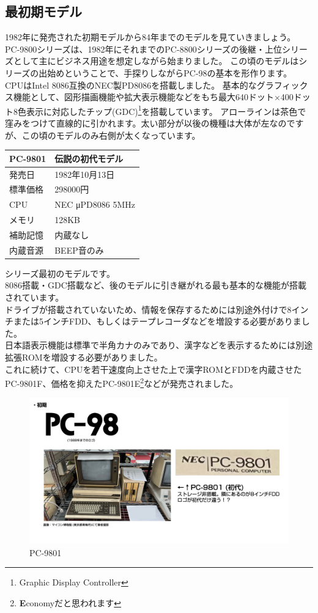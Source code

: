 \documentclass[b5paper,9pt,platex,dvipdfmx]{jsarticle}
\begin{document}
\begin{multicols}{3}
\subsection{最初期モデル}
1982年に発売された初期モデルから84年までのモデルを見ていきましょう。
PC-9800シリーズは、1982年にそれまでのPC-8800シリーズの後継・上位シリーズとして主にビジネス用途を想定しながら始まりました。
この頃のモデルはシリーズの出始めということで、手探りしながらPC-98の基本を形作ります。
CPUはIntel 8086互換のNEC製PD8086を搭載しました。
基本的なグラフィックス機能として、図形描画機能や拡大表示機能などをもち最大640ドット×400ドット8色表示に対応したチップ(GDC)\footnote{Graphic Display Controller}を搭載しています。
アローラインは茶色で窪みをつけて直線的に引かれます。太い部分が以後の機種は大体が左なのですが、この頃のモデルのみ右側が太くなっています。
\begin{table}[H]
  \centering
    \begin{tabular}{ll}
        {\bf PC-9801} & 伝説の初代モデル\\ \hline
        発売日 & 1982年10月13日\\
        標準価格 & 298000円\\
        CPU & NEC μPD8086 5MHz\\
        メモリ & 128KB\\
        補助記憶 & 内蔵なし\\
        内蔵音源 & BEEP音のみ\\
        \end{tabular}
\end{table}
シリーズ最初のモデルです。\\
8086搭載・GDC搭載など、後のモデルに引き継がれる最も基本的な機能が搭載されています。\\
ドライブが搭載されていないため、情報を保存するためには別途外付けで8インチまたは5インチFDD、もしくはテープレコーダなどを増設する必要がありました。\\
日本語表示機能は標準で半角カナのみであり、漢字などを表示するためには別途拡張ROMを増設する必要がありました。\\
これに続けて、CPUを若干速度向上させた上で漢字ROMとFDDを内蔵させたPC-9801F、価格を抑えたPC-9801E\footnote{{\bf E}conomyだと思われます}などが発売されました。\\
\end{multicols}
\begin{figure}[H]
  \centering
  \includegraphics[width=12.5cm]{img-7.jpg}
  \caption{PC-9801}
\end{figure}
\end{document}
